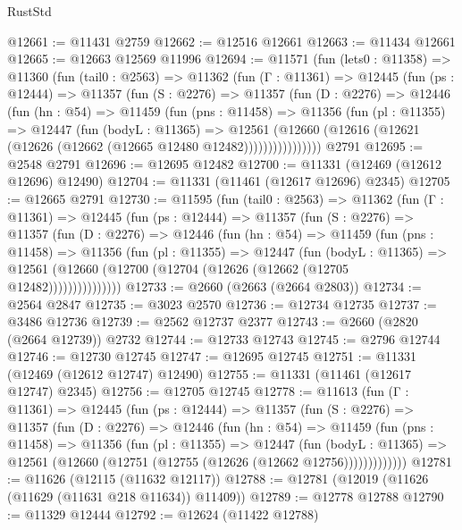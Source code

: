 \begin{lexlean}{RustStd}
\begin{coremodule}
@12661 := @11431 @2759
@12662 := @12516 @12661
@12663 := @11434 @12661
@12665 := @12663 @12569 @11996
@12694 := @11571
    (fun (lets0 : @11358) =>
    @11360
      (fun (tail0 : @2563) =>
      @11362
        (fun (Γ : @11361) =>
        @12445
          (fun (ps : @12444) =>
          @11357
            (fun (S : @2276) =>
            @11357
              (fun (D : @2276) =>
              @12446
                (fun (hn : @54) =>
                @11459
                  (fun (pns : @11458) =>
                  @11356
                    (fun (pl : @11355) =>
                    @12447
                      (fun (bodyL : @11365) =>
                      @12561
                        (@12660
                          (@12616 (@12621 (@12626 (@12662 (@12665 @12480 @12482))))))))))))))))
    @2791
@12695 := @2548 @2791
@12696 := @12695 @12482
@12700 := @11331 (@12469 (@12612 @12696) @12490)
@12704 := @11331 (@11461 (@12617 @12696) @2345)
@12705 := @12665 @2791
@12730 := @11595
    (fun (tail0 : @2563) =>
    @11362
      (fun (Γ : @11361) =>
      @12445
        (fun (ps : @12444) =>
        @11357
          (fun (S : @2276) =>
          @11357
            (fun (D : @2276) =>
            @12446
              (fun (hn : @54) =>
              @11459
                (fun (pns : @11458) =>
                @11356
                  (fun (pl : @11355) =>
                  @12447
                    (fun (bodyL : @11365) =>
                    @12561 (@12660 (@12700 (@12704 (@12626 (@12662 (@12705 @12482)))))))))))))))
@12733 := @2660 (@2663 (@2664 @2803))
@12734 := @2564 @2847
@12735 := @3023 @2570
@12736 := @12734 @12735
@12737 := @3486 @12736
@12739 := @2562 @12737 @2377
@12743 := @2660 (@2820 (@2664 @12739)) @2732
@12744 := @12733 @12743
@12745 := @2796 @12744
@12746 := @12730 @12745
@12747 := @12695 @12745
@12751 := @11331 (@12469 (@12612 @12747) @12490)
@12755 := @11331 (@11461 (@12617 @12747) @2345)
@12756 := @12705 @12745
@12778 := @11613
    (fun (Γ : @11361) =>
    @12445
      (fun (ps : @12444) =>
      @11357
        (fun (S : @2276) =>
        @11357
          (fun (D : @2276) =>
          @12446
            (fun (hn : @54) =>
            @11459
              (fun (pns : @11458) =>
              @11356
                (fun (pl : @11355) =>
                @12447
                  (fun (bodyL : @11365) =>
                  @12561 (@12660 (@12751 (@12755 (@12626 (@12662 @12756)))))))))))))
@12781 := @11626 (@12115 (@11632 @12117))
@12788 := @12781 (@12019 (@11626 (@11629 (@11631 @218 @11634)) @11409))
@12789 := @12778 @12788
@12790 := @11329 @12444
@12792 := @12624 (@11422 @12788)

\end{coremodule}
\end{lexlean}
